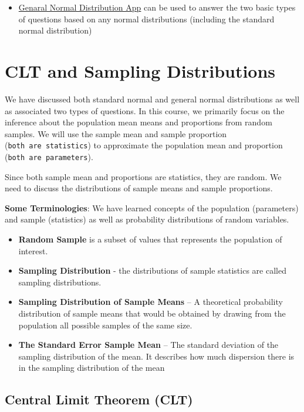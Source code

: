 \documentclass[
]{book}
\providecommand{\tightlist}{%
  \setlength{\itemsep}{0pt}\setlength{\parskip}{0pt}}
\begin{document}
\begin{itemize}
\tightlist
\item
  \href{https://peng-isla.shinyapps.io/TwoQ4NormalDist/}{Genaral Normal Distribution App} can be used to answer the two basic types of questions based on any normal distributions (including the standard normal distribution)
\end{itemize}

\hypertarget{clt-and-sampling-distributions}{%
\chapter{CLT and Sampling Distributions}\label{clt-and-sampling-distributions}}

We have discussed both standard normal and general normal distributions as well as associated two types of questions. In this course, we primarily focus on the inference about the population mean means and proportions from random samples. We will use the sample mean and sample proportion (\texttt{both\ are\ statistics}) to approximate the population mean and proportion (\texttt{both\ are\ parameters}).

Since both sample mean and proportions are statistics, they are random. We need to discuss the distributions of sample means and sample proportions.

\textbf{Some Terminologies}: We have learned concepts of the population (parameters) and sample (statistics) as well as probability distributions of random variables.

\begin{itemize}
\item
  \textbf{Random Sample} is a subset of values that represents the population of interest.
\item
  \textbf{Sampling Distribution} - the distributions of sample statistics are called sampling distributions.
\item
  \textbf{Sampling Distribution of Sample Means} -- A theoretical probability distribution of sample means that would be obtained by drawing from the population all possible samples of the same size.
\item
  \textbf{The Standard Error Sample Mean} -- The standard deviation of the sampling distribution of the mean. It describes how much dispersion there is in the sampling distribution of the mean
\end{itemize}

\hypertarget{central-limit-theorem-clt}{%
\section{Central Limit Theorem (CLT)}\label{central-limit-theorem-clt}}
\end{document}
